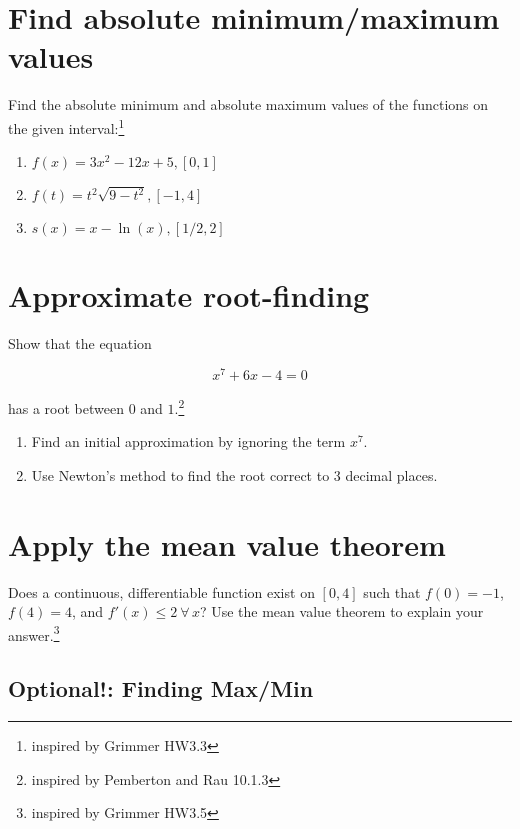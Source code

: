 \documentclass[
]{article}
\begin{document}
\section{Find absolute minimum/maximum
values}\label{find-absolute-minimummaximum-values}

Find the absolute minimum and absolute maximum values of the functions
on the given interval:\footnote{inspired by Grimmer HW3.3}

\begin{enumerate}
\def\labelenumi{\alph{enumi}.}
\item
  \(f(x) = 3x^2 - 12x + 5, [0,1]\)
\item
  \(f(t) = t^2\sqrt{9 - t^2}, [-1,4]\)
\item
  \(s(x) = x - \ln(x), [1/2, 2]\)
\end{enumerate}

\section{Approximate root-finding}\label{approximate-root-finding}

Show that the equation

\[x^7 + 6x - 4 = 0\]

has a root between \(0\) and \(1\).\footnote{inspired by Pemberton and
  Rau 10.1.3}

\begin{enumerate}
\def\labelenumi{\alph{enumi}.}
\item
  Find an initial approximation by ignoring the term \(x^7\).
\item
  Use Newton's method to find the root correct to 3 decimal places.
\end{enumerate}

\section{Apply the mean value
theorem}\label{apply-the-mean-value-theorem}

Does a continuous, differentiable function exist on \([0,4]\) such that
\(f(0) = -1\), \(f(4) = 4\), and \(f'(x) \le 2 \  \forall \, x\)? Use
the mean value theorem to explain your answer.\footnote{inspired by
  Grimmer HW3.5}

\subsection{Optional!: Finding Max/Min}\label{optional-finding-maxmin}
\end{document}
